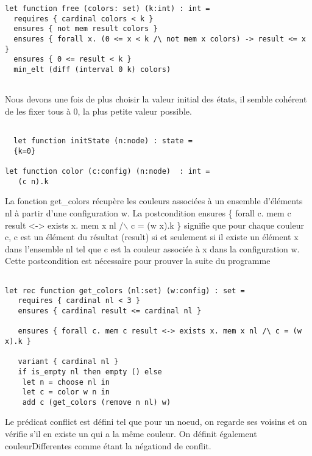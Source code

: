 \documentclass[11pt]{article}
\begin{document}
\lstset{language=why3,label= ,caption= ,captionpos=b,numbers=none}
\begin{lstlisting}
let function free (colors: set) (k:int) : int =
  requires { cardinal colors < k }
  ensures { not mem result colors }
  ensures { forall x. (0 <= x < k /\ not mem x colors) -> result <= x }
  ensures { 0 <= result < k }
  min_elt (diff (interval 0 k) colors)


\end{lstlisting}

Nous devons une fois de plus choisir la valeur initial des états, il semble cohérent de les fixer tous à 0, la plus petite valeur possible.

\lstset{language=why3,label= ,caption= ,captionpos=b,numbers=none}
\begin{lstlisting}

  let function initState (n:node) : state =
  {k=0}

let function color (c:config) (n:node)  : int =
   (c n).k

\end{lstlisting}

La fonction get\_colors récupère les couleurs associées à un ensemble d'éléments nl à partir d'une configuration w. 
La postcondition ensures \{ forall c. mem c result <-> exists x. mem x nl /$\backslash$ c = (w x).k \} signifie
que pour chaque couleur c, c est un élément du résultat (result) si et seulement si 
il existe un élément x dans l'ensemble nl tel que c est la couleur associée à x dans la configuration w.
Cette postcondition est nécessaire pour prouver la suite du programme

\lstset{language=why3,label= ,caption= ,captionpos=b,numbers=none}
\begin{lstlisting}

let rec function get_colors (nl:set) (w:config) : set =
   requires { cardinal nl < 3 }
   ensures { cardinal result <= cardinal nl }

   ensures { forall c. mem c result <-> exists x. mem x nl /\ c = (w x).k }

   variant { cardinal nl }
   if is_empty nl then empty () else
    let n = choose nl in
    let c = color w n in
    add c (get_colors (remove n nl) w)

\end{lstlisting}

Le prédicat conflict est défini tel que pour un noeud, on regarde ses voisins et on vérifie s'il en existe un qui a la même couleur.
On définit également couleurDifferentes comme étant la négationd de conflit. 
\end{document}
